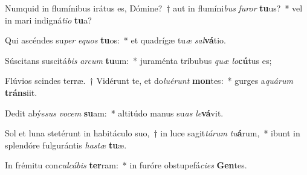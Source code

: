 \item Numquid in flumínibus irátus es, Dómine?~† aut in flumíni\textit{bus} \textit{fu}\textit{ror} \textbf{tu}us?~* vel in mari indigná\textit{ti}\textit{o} \textbf{tu}a?
\item Qui ascéndes su\textit{per} \textit{e}\textit{quos} \textbf{tu}os:~* et quadrígæ tu\textit{æ} \textit{sal}\textbf{vá}tio.
\item Súscitans suscitá\textit{bis} \textit{ar}\textit{cum} \textbf{tu}um:~* juraménta tríbubus \textit{quæ} \textit{lo}\textbf{cú}tus es;
\item Flúvios scindes terræ.~† Vidérunt te, et do\textit{lu}\textit{é}\textit{runt} \textbf{mon}tes:~* gurges a\textit{quá}\textit{rum} \textbf{tráns}iit.
\item Dedit abýs\textit{sus} \textit{vo}\textit{cem} \textbf{su}am:~* altitúdo manus su\textit{as} \textit{le}\textbf{vá}vit.
\item Sol et luna stetérunt in habitáculo suo,~† in luce sagit\textit{tá}\textit{rum} \textit{tu}\textbf{á}rum,~* ibunt in splendóre fulgurántis \textit{has}\textit{tæ} \textbf{tu}æ.
\item In frémitu con\textit{cul}\textit{cá}\textit{bis} \textbf{ter}ram:~* in furóre obstupefá\textit{ci}\textit{es} \textbf{Gen}tes.
